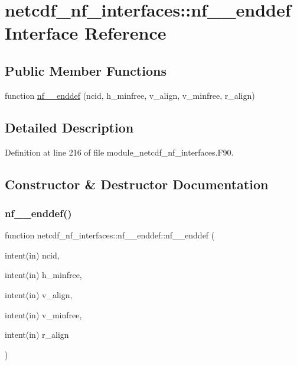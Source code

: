 \hypertarget{interfacenetcdf__nf__interfaces_1_1nf____enddef}{}\section{netcdf\+\_\+nf\+\_\+interfaces\+:\+:nf\+\_\+\+\_\+enddef Interface Reference}
\label{interfacenetcdf__nf__interfaces_1_1nf____enddef}
\subsection*{Public Member Functions}
\begin{DoxyCompactItemize}
\item 
function \hyperlink{interfacenetcdf__nf__interfaces_1_1nf____enddef_a4557bdccfee09021828c311cb43d0226}{nf\+\_\+\+\_\+enddef} (ncid, h\+\_\+minfree, v\+\_\+align, v\+\_\+minfree, r\+\_\+align)
\end{DoxyCompactItemize}


\subsection{Detailed Description}


Definition at line 216 of file module\+\_\+netcdf\+\_\+nf\+\_\+interfaces.\+F90.



\subsection{Constructor \& Destructor Documentation}
\mbox{\label{interfacenetcdf__nf__interfaces_1_1nf____enddef_a4557bdccfee09021828c311cb43d0226}} 
\subsubsection{\texorpdfstring{nf\+\_\+\+\_\+enddef()}{nf\_\_enddef()}}
{\footnotesize\ttfamily function netcdf\+\_\+nf\+\_\+interfaces\+::nf\+\_\+\+\_\+enddef\+::nf\+\_\+\+\_\+enddef (\begin{DoxyParamCaption}\item[{intent(in)}]{ncid,  }\item[{intent(in)}]{h\+\_\+minfree,  }\item[{intent(in)}]{v\+\_\+align,  }\item[{intent(in)}]{v\+\_\+minfree,  }\item[{intent(in)}]{r\+\_\+align }\end{DoxyParamCaption})}



